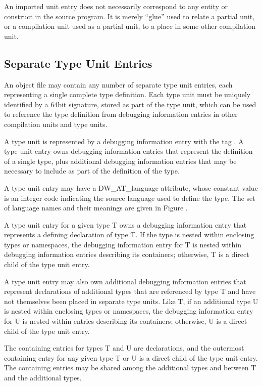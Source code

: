 An imported unit entry does not necessarily correspond to
any entity or construct in the source program. It is merely
“glue” used to relate a partial unit, or a compilation
unit used as a partial unit, to a place in some other
compilation unit.

\subsection{Separate Type Unit Entries}
\label{chap:separatetypeunitentries}
An object file may contain any number of separate type
unit entries, each representing a single complete type
definition. Each type unit must be uniquely identified by
a 64\dash bit signature, stored as part of the type unit, which
can be used to reference the type definition from debugging
information entries in other compilation units and type units.

A type unit is represented by a debugging information entry
with the tag . 
A type unit entry owns debugging
information entries that represent the definition of a single
type, plus additional debugging information entries that may
be necessary to include as part of the definition of the type.

A type unit entry may have a DW\_AT\_language attribute, whose
constant value is an integer code indicating the source
language used to define the type. The set of language names
and their meanings are given in Figure .

A type unit entry for a given type T owns a debugging
information entry that represents a defining declaration
of type T. If the type is nested within enclosing types or
namespaces, the debugging information entry for T is nested
within debugging information entries describing its containers;
otherwise, T is a direct child of the type unit entry.

A type unit entry may also own additional debugging information
entries that represent declarations of additional types that
are referenced by type T and have not themselves been placed in
separate type units. Like T, if an additional type U is nested
within enclosing types or namespaces, the debugging information
entry for U is nested within entries describing its containers;
otherwise, U is a direct child of the type unit entry.

The containing entries for types T and U are declarations,
and the outermost containing entry for any given type T or
U is a direct child of the type unit entry. The containing
entries may be shared among the additional types and between
T and the additional types.

